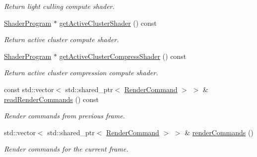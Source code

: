 \begin{Indent}
\begin{DoxyCompactItemize}
\begin{DoxyCompactList}\small\item\em Return light culling compute shader. \end{DoxyCompactList}\item 
\mbox{\label{classrev_1_1_main_renderer_aa1417d39dd8fd8ba3d842f990252e06a}} 
\mbox{\hyperlink{classrev_1_1_shader_program}{Shader\+Program}} $\ast$ \mbox{\hyperlink{classrev_1_1_main_renderer_aa1417d39dd8fd8ba3d842f990252e06a}{get\+Active\+Cluster\+Shader}} () const
\begin{DoxyCompactList}\small\item\em Return active cluster compute shader. \end{DoxyCompactList}\item 
\mbox{\label{classrev_1_1_main_renderer_a97adb2d18706ba30a739e458f40792dd}} 
\mbox{\hyperlink{classrev_1_1_shader_program}{Shader\+Program}} $\ast$ \mbox{\hyperlink{classrev_1_1_main_renderer_a97adb2d18706ba30a739e458f40792dd}{get\+Active\+Cluster\+Compress\+Shader}} () const
\begin{DoxyCompactList}\small\item\em Return active cluster compression compute shader. \end{DoxyCompactList}\item 
\mbox{\label{classrev_1_1_main_renderer_a038d00b1bbb07738981a53c9451ab6d8}} 
const std\+::vector$<$ std\+::shared\+\_\+ptr$<$ \mbox{\hyperlink{classrev_1_1_render_command}{Render\+Command}} $>$ $>$ \& \mbox{\hyperlink{classrev_1_1_main_renderer_a038d00b1bbb07738981a53c9451ab6d8}{read\+Render\+Commands}} () const
\begin{DoxyCompactList}\small\item\em Render commands from previous frame. \end{DoxyCompactList}\item 
\mbox{\label{classrev_1_1_main_renderer_a543cae4a1cf7557ce41acbd8e2597222}} 
std\+::vector$<$ std\+::shared\+\_\+ptr$<$ \mbox{\hyperlink{classrev_1_1_render_command}{Render\+Command}} $>$ $>$ \& \mbox{\hyperlink{classrev_1_1_main_renderer_a543cae4a1cf7557ce41acbd8e2597222}{render\+Commands}} ()
\begin{DoxyCompactList}\small\item\em Render commands for the current frame. \end{DoxyCompactList}\item 

\end{DoxyCompactItemize}
\end{Indent}
